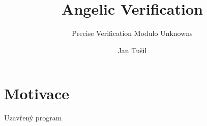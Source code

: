 \documentclass[11pt]{beamer}
\author{Jan Tušil}
\title{Angelic Verification}
\subtitle{Precise Verification Modulo Unknowns}
\begin{document}
\begin{frame}
\titlepage
\end{frame}

\begin{frame}
\tableofcontents[pausesections]
\end{frame}


\section{Motivace}


\begin{frame}[fragile]{Uzavřený program}


\end{frame}






\end{document}
